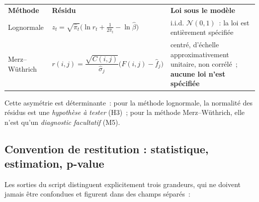 \documentclass[a4paper,11pt]{article}
\begin{document}
\begin{center}
\small
{}
\begin{tabular}{@{}p{3.0cm}p{5.6cm}p{6.3cm}@{}}
\rowcolor{tableheader}
\textcolor{financeblue}{\textbf{Méthode}} &
\textcolor{financeblue}{\textbf{Résidu}} &
\textcolor{financeblue}{\textbf{Loi sous le modèle}} \\
Lognormale & $z_t = \sqrt{\hat\pi_t}\big(\ln r_t + \tfrac{1}{2\hat\pi_t} - \ln\hat\beta\big)$ &
i.i.d. $\mathcal{N}(0,1)$~: la loi est entièrement spécifiée \\
Merz--Wüthrich & $r(i,j) = \dfrac{\sqrt{C(i,j)}}{\hat\sigma_j}\big(F(i,j) - \hat f_j\big)$ &
centré, d'échelle approximativement unitaire, non corrélé~; \textbf{aucune loi
n'est spécifiée} \\
\end{tabular}
\end{center}

\noindent
Cette asymétrie est déterminante~: pour la méthode lognormale, la normalité des
résidus est une \emph{hypothèse à tester} (H3)~; pour la méthode Merz--Wüthrich,
elle n'est qu'un \emph{diagnostic facultatif} (M5).

\subsection*{Convention de restitution : statistique, estimation, p-value}

Les sorties du script distinguent explicitement trois grandeurs, qui ne doivent jamais être
confondues et figurent dans des champs séparés~:
\end{document}

